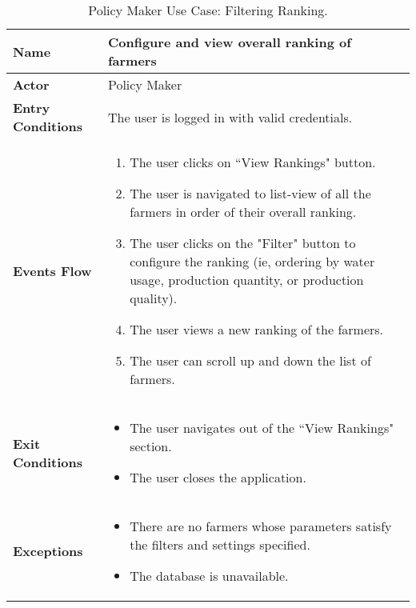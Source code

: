 
\begin{table}[hbt!]
\centering
\small
\caption{\label{tab:policyUseViewRank}Policy Maker Use Case: Filtering Ranking.}
\renewcommand{\arraystretch}{1.25}
\begin{tabular}{|l|>{\raggedright\arraybackslash}m{12cm}|}

    \hline
    \textbf{Name} & Configure and view overall ranking of farmers\\
    \hline
   	\textbf{Actor} & Policy Maker\\
    \hline
    \textbf{Entry Conditions} & The user is logged in with valid credentials.\\
    \hline
    \textbf{Events Flow} & 
    \begin{enumerate}
   	\item The user clicks on “View Rankings" button.
   	\item The user is navigated to list-view of all the farmers in order of their overall ranking. 
    \item The user clicks on the "Filter" button to configure the ranking (ie, ordering by water usage, production quantity, or production quality). 
    	\item The user views a new ranking of the farmers. 
    	\item The user can scroll up and down the list of farmers.
    \end{enumerate} \\ \hline
    \textbf{Exit Conditions} & 
    \begin{itemize}
    	\item The user navigates out of the “View Rankings" section. 
    	\item The user closes the application.
    \end{itemize}\\
    \hline
    \textbf{Exceptions} & 
    \begin{itemize}
    	\item There are no farmers whose parameters satisfy the filters and settings specified.
    	\item The database is unavailable.
    \end{itemize}\\
    \hline
\end{tabular}
\end{table}